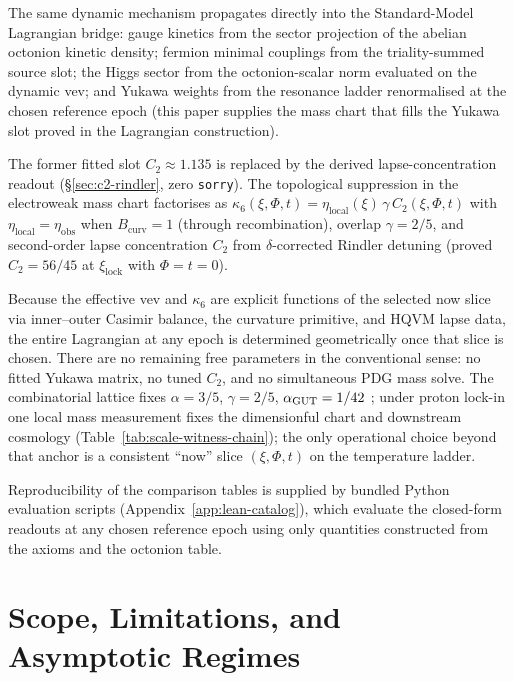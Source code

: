 \documentclass[11pt]{amsart}
\begin{document}
The same dynamic mechanism propagates directly into the Standard-Model Lagrangian bridge: gauge kinetics from the sector projection of the abelian octonion kinetic density; fermion minimal couplings from the triality-summed source slot; the Higgs sector from the octonion-scalar norm evaluated on the dynamic vev; and Yukawa weights from the resonance ladder renormalised at the chosen reference epoch (this paper supplies the mass chart that fills the Yukawa slot proved in the Lagrangian construction).

The former fitted slot $C_2\approx 1.135$ is replaced by the derived lapse-concentration readout (\S\ref{sec:c2-rindler}, zero \texttt{sorry}). The topological suppression in the electroweak mass chart factorises as $\kappa_6(\xi,\Phi,t)=\eta_{\mathrm{local}}(\xi)\,\gamma\,C_2(\xi,\Phi,t)$ with $\eta_{\mathrm{local}}=\eta_{\mathrm{obs}}$ when $B_{\mathrm{curv}}=1$ (through recombination), overlap $\gamma=2/5$, and second-order lapse concentration $C_2$ from $\delta$-corrected Rindler detuning (proved $C_2=56/45$ at $\xi_{\mathrm{lock}}$ with $\Phi=t=0$).

Because the effective vev and $\kappa_6$ are explicit functions of the selected now slice via inner--outer Casimir balance, the curvature primitive, and HQVM lapse data, the entire Lagrangian at any epoch is determined geometrically once that slice is chosen. There are no remaining free parameters in the conventional sense: no fitted Yukawa matrix, no tuned $C_2$, and no simultaneous PDG mass solve. The combinatorial lattice fixes $\alpha=3/5$, $\gamma=2/5$, $\alpha_{\rm GUT}=1/42$ \cite{georgi1974}; under proton lock-in one local mass measurement fixes the dimensionful chart and downstream cosmology (Table~\ref{tab:scale-witness-chain}); the only operational choice beyond that anchor is a consistent ``now'' slice $(\xi,\Phi,t)$ on the temperature ladder.

Reproducibility of the comparison tables is supplied by bundled Python evaluation scripts (Appendix~\ref{app:lean-catalog}), which evaluate the closed-form readouts at any chosen reference epoch using only quantities constructed from the axioms and the octonion table.

\section{Scope, Limitations, and Asymptotic Regimes}
\end{document}
